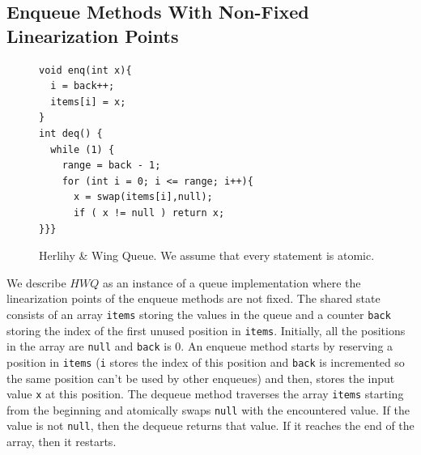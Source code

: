 \subsection{Enqueue Methods With Non-Fixed Linearization Points}
\vspace{-1.5mm}
\begin{figure}
\vspace{-8mm}
\begin{lstlisting}
void enq(int x){
  i = back++;
  items[i] = x;
}
int deq() {
  while (1) {
    range = back - 1;
    for (int i = 0; i <= range; i++){
      x = swap(items[i],null);
      if ( x != null ) return x;
}}}
  \end{lstlisting}
\vspace{-5mm}
\caption{Herlihy \& Wing Queue. We assume that every statement is atomic.}
\label{fig:HerlihyWing}
\vspace{-7mm}
\end{figure}
We describe $\mathit{HWQ}$ as an instance of a queue implementation where the linearization points of the enqueue methods are not fixed.
The shared state consists of an array {\tt items} storing the values in the queue and a counter {\tt back} storing the index of the first unused position in {\tt items}. Initially, all the positions in the array are {\tt null} and {\tt back} is 0.
An enqueue method starts by reserving a position in {\tt items} ({\tt i} stores the index of this position and {\tt back} is incremented so the same position can't be used by other enqueues) and then, stores the input value {\tt x} at this position. The dequeue method traverses the array {\tt items} starting from the beginning and atomically swaps {\tt null} with the encountered value. If the value is not {\tt null}, then the dequeue returns that value. If it reaches the end of the array, then it restarts.

